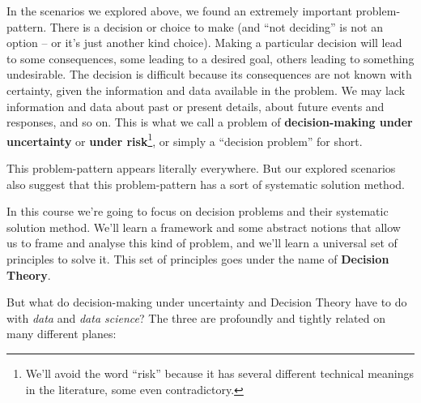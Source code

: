 \documentclass[
  a4paper,
  DIV=11,
  numbers=noendperiod,
  oneside]{scrreprt}
\begin{document}
In the scenarios we explored above, we found an extremely important
problem-pattern. There is a decision or choice to make (and ``not
deciding'' is not an option -- or it's just another kind choice). Making
a particular decision will lead to some consequences, some leading to a
desired goal, others leading to something undesirable. The decision is
difficult because its consequences are not known with certainty, given
the information and data available in the problem. We may lack
information and data about past or present details, about future events
and responses, and so on. This is what we call a problem of
{\textbf{decision-making under uncertainty}} or \textbf{under
risk}\footnote{We'll avoid the word ``risk'' because it has several
  different technical meanings in the literature, some even
  contradictory.}, or simply a ``decision problem'' for short.

This problem-pattern appears literally everywhere. But our explored
scenarios also suggest that this problem-pattern has a sort of
systematic solution method.

In this course we're going to focus on decision problems and their
systematic solution method. We'll learn a framework and some abstract
notions that allow us to frame and analyse this kind of problem, and
we'll learn a universal set of principles to solve it. This set of
principles goes under the name of {\textbf{Decision Theory}}.

But what do decision-making under uncertainty and Decision Theory have
to do with \emph{data} and \emph{data science}? The three are profoundly
and tightly related on many different planes:

\end{document}
